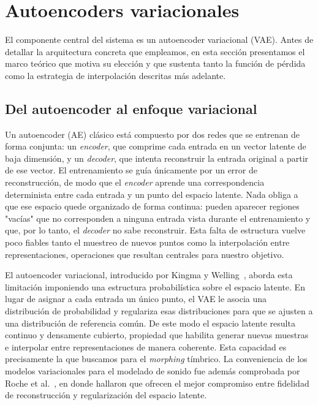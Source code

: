 \documentclass[12pt,a4paper,twoside]{tesis}
\begin{document}
\newpage
\section{Autoencoders variacionales}
\label{sec:vae}

El componente central del sistema es un autoencoder variacional (VAE). Antes de detallar la arquitectura concreta que empleamos, en esta sección presentamos el marco teórico que motiva su elección y que sustenta tanto la función de pérdida como la estrategia de interpolación descritas más adelante.


\subsection{Del autoencoder al enfoque variacional}

Un autoencoder (AE) clásico está compuesto por dos redes que se entrenan de forma conjunta: un \textit{encoder}, que comprime cada entrada en un vector latente de baja dimensión, y un \textit{decoder}, que intenta reconstruir la entrada original a partir de ese vector. El entrenamiento se guía únicamente por un error de reconstrucción, de modo que el \textit{encoder} aprende una correspondencia determinista entre cada entrada y un punto del espacio latente. Nada obliga a que ese espacio quede organizado de forma continua: pueden aparecer regiones "vacías" que no corresponden a ninguna entrada vista durante el entrenamiento y que, por lo tanto, el \textit{decoder} no sabe reconstruir. Esta falta de estructura vuelve poco fiables tanto el muestreo de nuevos puntos como la interpolación entre representaciones, operaciones que resultan centrales para nuestro objetivo.

El autoencoder variacional, introducido por Kingma y Welling~\cite{kingma2013auto}, aborda esta limitación imponiendo una estructura probabilística sobre el espacio latente. En lugar de asignar a cada entrada un único punto, el VAE le asocia una distribución de probabilidad y regulariza esas distribuciones para que se ajusten a una distribución de referencia común. De este modo el espacio latente resulta continuo y densamente cubierto, propiedad que habilita generar nuevas muestras e interpolar entre representaciones de manera coherente. Esta capacidad es precisamente la que buscamos para el \emph{morphing} tímbrico. La conveniencia de los modelos variacionales para el modelado de sonido fue además comprobada por Roche et al.~\cite{roche2019autoencodersmusicsoundmodeling}, en donde hallaron que ofrecen el mejor compromiso entre fidelidad de reconstrucción y regularización del espacio latente.
\end{document}

